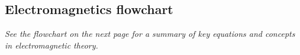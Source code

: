 \documentclass[11pt, oneside]{book}
\begin{document}
\frontmatter
\makecoursetitle
\mainmatter




% 
% 

\begin{appendices}

\chapter*{Electromagnetics flowchart}
\textit{See the flowchart on the next page for a summary of key equations and concepts in electromagnetic theory.}

\pagebreak

\scalebox{0.9}{}

\end{appendices}
\end{document}
